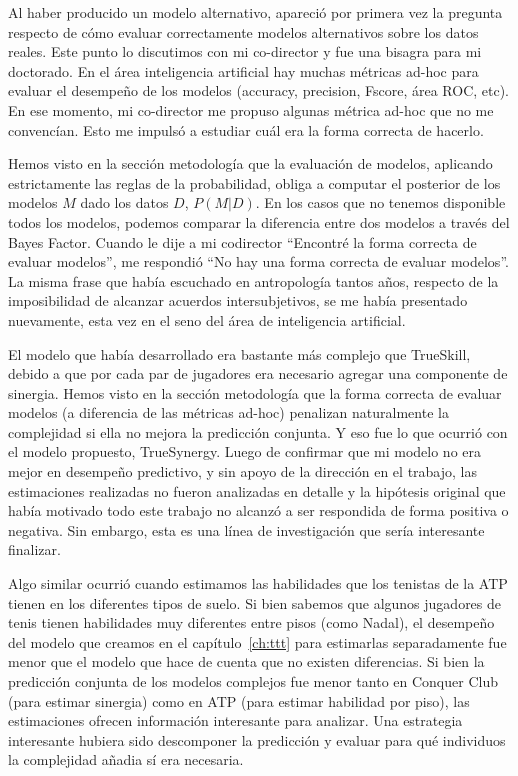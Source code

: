 \documentclass[a4paper,11pt]{book}
\theoremstyle{definition}
\begin{document}

Al haber producido un modelo alternativo, apareci\'o por primera vez la pregunta respecto de c\'omo evaluar correctamente modelos alternativos sobre los datos reales.
%
Este punto lo discutimos con mi co-director y fue una bisagra para mi doctorado.
%
En el \'area inteligencia artificial hay muchas m\'etricas ad-hoc para evaluar el desempe\~no de los modelos (accuracy, precision, Fscore, \'area ROC, etc).
%
En ese momento, mi co-director me propuso algunas m\'etrica ad-hoc que no me convenc\'ian.
%
Esto me impuls\'o a estudiar cu\'al era la forma correcta de hacerlo.


Hemos visto en la secci\'on metodolog\'ia que la evaluaci\'on de modelos, aplicando estrictamente las reglas de la probabilidad, obliga a computar el posterior de los modelos $M$ dado los datos $D$, $P(M|D)$.
%
En los casos que no tenemos disponible todos los modelos, podemos comparar la diferencia entre dos modelos a trav\'es del Bayes Factor.
%
Cuando le dije a mi codirector ``Encontr\'e la forma correcta de evaluar modelos'', me respondi\'o ``No hay una forma correcta de evaluar modelos''.
%
La misma frase que hab\'ia escuchado en antropolog\'ia tantos a\~nos, respecto de la imposibilidad de alcanzar acuerdos intersubjetivos, se me hab\'ia presentado nuevamente, esta vez en el seno del \'area de inteligencia artificial.


El modelo que hab\'ia desarrollado era bastante m\'as complejo que TrueSkill, debido a que por cada par de jugadores era necesario agregar una componente de sinergia.
%
Hemos visto en la secci\'on metodolog\'ia que la forma correcta de evaluar modelos (a diferencia de las m\'etricas ad-hoc) penalizan naturalmente la complejidad si ella no mejora la predicci\'on conjunta.
%
Y eso fue lo que ocurri\'o con el modelo propuesto, TrueSynergy.
%
Luego de confirmar que mi modelo no era mejor en desempe\~no predictivo, y sin apoyo de la direcci\'on en el trabajo, las estimaciones realizadas no fueron analizadas en detalle y la hip\'otesis original que hab\'ia motivado todo este trabajo no alcanz\'o a ser respondida de forma positiva o negativa.
%
Sin embargo, esta es una l\'inea de investigaci\'on que ser\'ia interesante finalizar.


Algo similar ocurri\'o cuando estimamos las habilidades que los tenistas de la ATP tienen en los diferentes tipos de suelo.
%
Si bien sabemos que algunos jugadores de tenis tienen habilidades muy diferentes entre pisos (como Nadal), el desempe\~no del modelo que creamos en el cap\'itulo~\ref{ch:ttt} para estimarlas separadamente fue menor que el modelo que hace de cuenta que no existen diferencias.
%
Si bien la predicci\'on conjunta de los modelos complejos fue menor tanto en Conquer Club (para estimar sinergia) como en ATP (para estimar habilidad por piso), las estimaciones ofrecen informaci\'on interesante para analizar.
%
Una estrategia interesante hubiera sido descomponer la predicci\'on y evaluar para qu\'e individuos la complejidad a\~nadia s\'i era necesaria.
\end{document}
